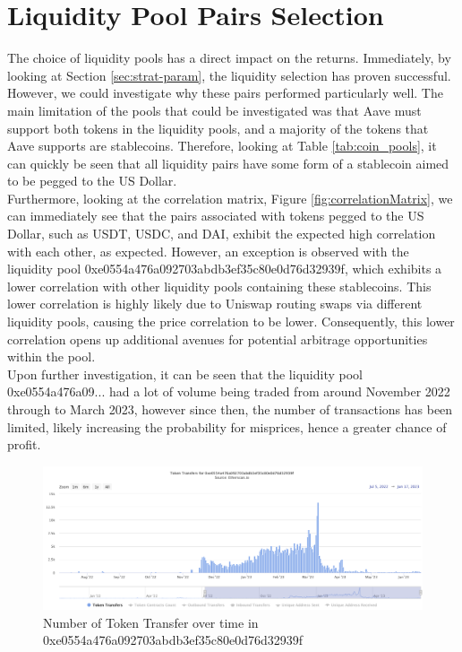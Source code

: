 \section{Liquidity Pool Pairs Selection}
The choice of liquidity pools has a direct impact on the returns. Immediately, by looking at Section \ref{sec:strat-param}, the liquidity selection has proven successful. However, we could investigate why these pairs performed particularly well. The main limitation of the pools that could be investigated was that Aave must support both tokens in the liquidity pools, and a majority of the tokens that Aave supports are stablecoins. Therefore, looking at Table \ref{tab:coin_pools}, it can quickly be seen that all liquidity pairs have some form of a stablecoin aimed to be pegged to the US Dollar.
\\[3mm]
Furthermore, looking at the correlation matrix, Figure \ref{fig:correlationMatrix}, we can immediately see that the pairs associated with tokens pegged to the US Dollar, such as USDT, USDC, and DAI, exhibit the expected high correlation with each other, as expected. However, an exception is observed with the liquidity pool 0xe0554a476a092703abdb3ef35c80e0d76d32939f, which exhibits a lower correlation with other liquidity pools containing these stablecoins. This lower correlation is highly likely due to Uniswap routing swaps via different liquidity pools, causing the price correlation to be lower. Consequently, this lower correlation opens up additional avenues for potential arbitrage opportunities within the pool.
\\[3mm]
Upon further investigation, it can be seen that the liquidity pool 0xe0554a476a09... had a lot of volume being traded from around November 2022 through to March 2023, however since then, the number of transactions has been limited, likely increasing the probability for misprices, hence a greater chance of profit.

\begin{figure}[htb!]
    \centering
    \includegraphics[width=0.8\linewidth]{evaluation/Images/pool-txn-history.png}
    \caption{Number of Token Transfer over time in 0xe0554a476a092703abdb3ef35c80e0d76d32939f~\cite{etherscan-pool}}
    \label{fig:pool-txn-history}
\end{figure}

